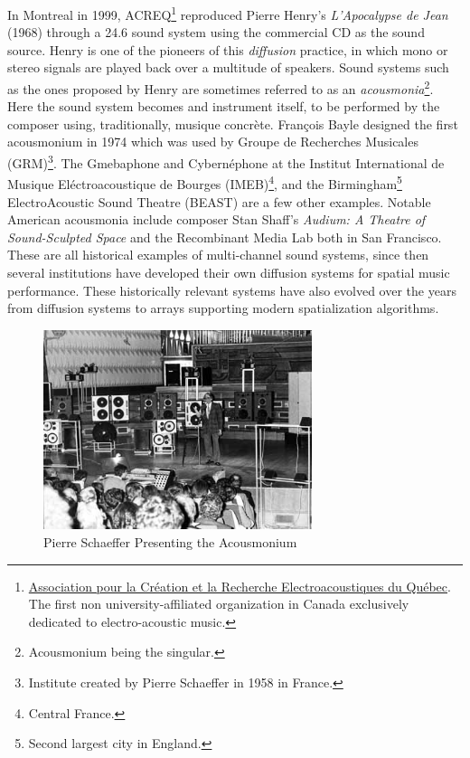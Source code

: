 In Montreal in 1999, ACREQ\footnote{\href{https://www.thecanadianencyclopedia.ca/en/article/acreq-emc}{Association pour la Création et la Recherche Electroacoustiques du Québec}. The first non university-affiliated organization in Canada exclusively dedicated to electro-acoustic music.} reproduced Pierre Henry's \textit{L'Apocalypse de Jean} (1968) through a 24.6 sound system using the commercial CD as the sound source. Henry is one of the pioneers of this \textit{diffusion} practice, in which mono or stereo signals are played back over a multitude of speakers. Sound systems such as the ones proposed by Henry are sometimes referred to as an \textit{acousmonia}\footnote{Acousmonium being the singular.}. Here the sound system becomes and instrument itself, to be performed by the composer using, traditionally, musique concrète. François Bayle designed the first acousmonium in 1974 which was used by Groupe de Recherches Musicales (GRM)\footnote{Institute created by Pierre Schaeffer in 1958 in France.}. The Gmebaphone and Cybernéphone at the Institut International de Musique Eléctroacoustique de Bourges (IMEB)\footnote{Central France.}, and the Birmingham\footnote{Second largest city in England.} ElectroAcoustic Sound Theatre (BEAST) are a few other examples. Notable American acousmonia include composer Stan Shaff's \textit{Audium: A Theatre of Sound-Sculpted Space} and the Recombinant Media Lab both in San Francisco. These are all historical examples of multi-channel sound systems, since then several institutions have developed their own diffusion systems for spatial music performance. These historically relevant systems have also evolved over the years from diffusion systems to arrays supporting modern spatialization algorithms.

\begin{figure}[ht!]%
\centering
\includegraphics[width=0.7\textwidth]{img/acousmonium.jpg} 
\caption{Pierre Schaeffer Presenting the Acousmonium \cite{FilePsco51online}}
\end{figure}

